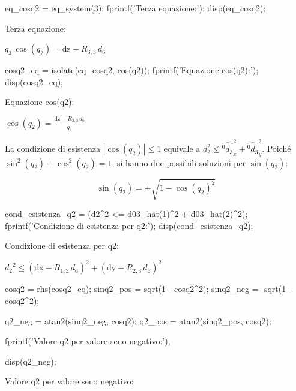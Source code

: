 \documentclass[11pt, a4paper]{article}
\begin{document}
\begin{matlabcode}
eq_cosq2 = eq_system(3);
fprintf('Terza equazione:');
disp(eq_cosq2);
\end{matlabcode}
\begin{matlaboutput}
Terza equazione:
\end{matlaboutput}
\begin{matlabsymbolicoutput}
$\displaystyle q_3 \,\cos \left(q_2 \right)=\textrm{dz}-R_{3,3} \,d_6 $
\end{matlabsymbolicoutput}
\begin{matlabcode}

cosq2_eq = isolate(eq_cosq2, cos(q2));
fprintf('Equazione cos(q2):');
disp(cosq2_eq);
\end{matlabcode}
\begin{matlaboutput}
Equazione cos(q2):
\end{matlaboutput}
\begin{matlabsymbolicoutput}
$\displaystyle \cos \left(q_2 \right)=\frac{\textrm{dz}-R_{3,3} \,d_6 }{q_3 }$
\end{matlabsymbolicoutput}

\begin{par}
\begin{flushleft}
La condizione di esistenza $|\cos (q_2 )|\le 1$ equivale a $d_2^2 \le {\hat{^0 d_3 }}_x^2 + {\hat{^0 d_3 }}_y^2$. Poiché $\sin^2 (q_2 )+\cos^2 (q_2 )=1$, si hanno due possibili soluzioni per $\sin (q_2 )$:
\end{flushleft}
\end{par}

\[
    \sin (q_2 )=\pm \sqrt{1-\cos (q_2 )^2}
\]

\begin{matlabcode}
cond_esistenza_q2 = (d2^2 <= d03_hat(1)^2 + d03_hat(2)^2);
fprintf('Condizione di esistenza per q2:');
disp(cond_esistenza_q2);
\end{matlabcode}
\begin{matlaboutput}
Condizione di esistenza per q2:
\end{matlaboutput}
\begin{matlabsymbolicoutput}
$\displaystyle {d_2 }^2 \le {{\left(\textrm{dx}-R_{1,3} \,d_6 \right)}}^2 +{{\left(\textrm{dy}-R_{2,3} \,d_6 \right)}}^2 $
\end{matlabsymbolicoutput}
\begin{matlabcode}
cosq2 = rhs(cosq2_eq);
sinq2_pos = sqrt(1 - cosq2^2);
sinq2_neg = -sqrt(1 - cosq2^2);

q2_neg = atan2(sinq2_neg, cosq2);
q2_pos = atan2(sinq2_pos, cosq2);

fprintf('Valore q2 per valore seno negativo:');

disp(q2_neg);
\end{matlabcode}
\begin{matlaboutput}
Valore q2 per valore seno negativo:
\end{matlaboutput}
\end{document}

